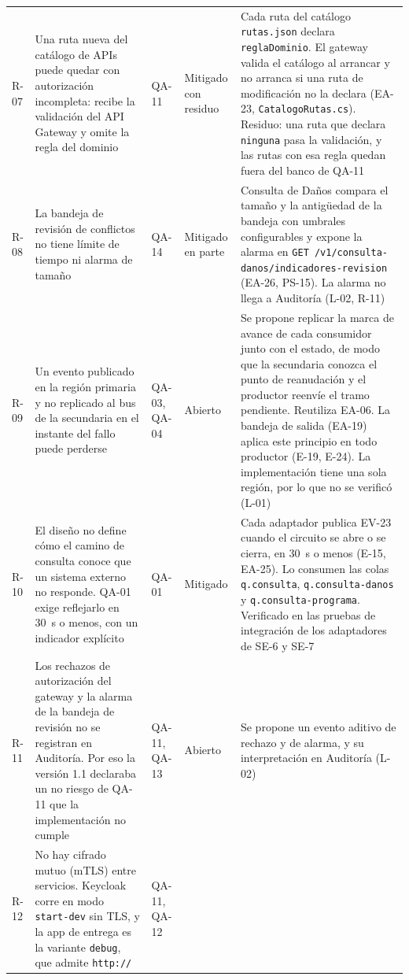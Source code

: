\documentclass[11pt,letterpaper]{article}
\providecommand{\br}{\discretionary{}{}{}}
\begin{document}
\begin{longtable}{L{1.05cm} L{4.8cm} L{1.9cm} L{1.9cm} L{5.5cm}}
R-07 & Una ruta nueva del catálogo de APIs puede quedar con autorización incompleta: recibe la
validación del API Gateway y omite la regla del dominio & QA-11 & Mitigado con residuo & Cada
ruta del catálogo \texttt{rutas.json} declara \texttt{reglaDominio}. El gateway valida el catálogo
al arrancar y no arranca si una ruta de modificación no la declara (EA-23,
\texttt{CatalogoRutas.cs}). Residuo: una ruta que declara \texttt{ninguna} pasa la validación, y
las rutas con esa regla quedan fuera del banco de QA-11 \\
R-08 & La bandeja de revisión de conflictos no tiene límite de tiempo ni alarma de tamaño & QA-14 &
Mitigado en parte & Consulta de Daños compara el tamaño y la antigüedad de la bandeja con umbrales
configurables y expone la alarma en \texttt{GET /v1/\br consulta-danos/\br indicadores-revision} (EA-26,
PS-15). La alarma no llega a Auditoría (L-02, R-11) \\
R-09 & Un evento publicado en la región primaria y no replicado al bus de la secundaria en el
instante del fallo puede perderse & QA-03, QA-04 & Abierto & Se propone replicar la marca de avance
de cada consumidor junto con el estado, de modo que la secundaria conozca el punto de reanudación y
el productor reenvíe el tramo pendiente. Reutiliza EA-06. La bandeja de salida (EA-19) aplica este
principio en todo productor (E-19, E-24). La implementación tiene una sola región, por lo que no se
verificó (L-01) \\
R-10 & El diseño no define cómo el camino de consulta conoce que un sistema externo no responde.
QA-01 exige reflejarlo en \qty{30}{\second} o menos, con un indicador explícito & QA-01 & Mitigado &
Cada adaptador publica EV-23 cuando el circuito se abre o se cierra, en \qty{30}{\second} o menos
(E-15, EA-25). Lo consumen las colas \texttt{q.consulta}, \texttt{q.consulta-danos} y
\texttt{q.consulta-programa}. Verificado en las pruebas de integración de los adaptadores de SE-6 y
SE-7 \\
R-11 & Los rechazos de autorización del gateway y la alarma de la bandeja de revisión no se
registran en Auditoría. Por eso la versión 1.1 declaraba un no riesgo de QA-11 que la implementación
no cumple & QA-11, QA-13 & Abierto & Se propone un evento aditivo de rechazo y de alarma, y su
interpretación en Auditoría (L-02) \\
R-12 & No hay cifrado mutuo (mTLS) entre servicios. Keycloak corre en modo \texttt{start-dev} sin
TLS, y la app de entrega es la variante \texttt{debug}, que admite \texttt{http://} & QA-11, QA-12

\end{longtable}
\end{document}
